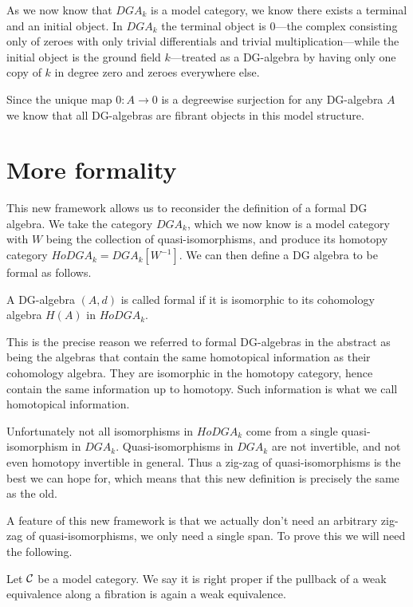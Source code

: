 As we now know that $DGA_k$ is a model category, we know there exists a terminal and an initial object. In $DGA_k$ the terminal object is $0$---the complex consisting only of zeroes with only trivial differentials and trivial multiplication---while the initial object is the ground field $k$---treated as a DG-algebra by having only one copy of $k$ in degree zero and zeroes everywhere else. 

Since the unique map $0: A\longrightarrow 0$ is a degreewise surjection for any DG-algebra $A$ we know that all DG-algebras are fibrant objects in this model structure. 




\section{More formality}

This new framework allows us to reconsider the definition of a formal DG algebra. We take the category $DGA_k$, which we now know is a model category with $W$ being the collection of quasi-isomorphisms, and produce its homotopy category $HoDGA_k = DGA_k[W^{-1}]$. We can then define a DG algebra to be formal as follows. 

\begin{definition}
A DG-algebra $(A, d)$ is called formal if it is isomorphic to its cohomology algebra $H(A)$ in $HoDGA_k$.
\end{definition}

This is the precise reason we referred to formal DG-algebras in the abstract as being the algebras that contain the same homotopical information as their cohomology algebra. They are isomorphic in the homotopy category, hence contain the same information up to homotopy. Such information is what we call homotopical information. 

Unfortunately not all isomorphisms in $HoDGA_k$ come from a single quasi-isomorphism in $DGA_k$. Quasi-isomorphisms in $DGA_k$ are not invertible, and not even homotopy invertible in general. Thus a zig-zag of quasi-isomorphisms is the best we can hope for, which means that this new definition is precisely the same as the old. 

A feature of this new framework is that we actually don't need an arbitrary zig-zag of quasi-isomorphisms, we only need a single span. To prove this we will need the following. 

\begin{definition}
Let $\mathcal{C}$ be a model category. We say it is right proper if the pullback of a weak equivalence along a fibration is again a weak equivalence. 
\end{definition}

